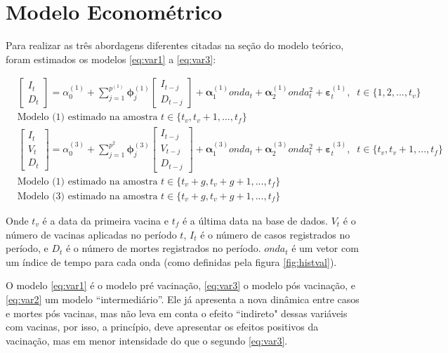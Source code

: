 \documentclass[
    article,
	12pt,				%
	oneside,			%
	a4paper,			%
	english,			%
	brazil,				%
	hyperref = {colorlinks, citecolor=c1d, linkcolor=c2d, urlcolor=c3d, colorlinks}
	]{abntex2}
\newcounter{j}
\begin{document}
\let\clearpage\relax
\chapter{Modelo Econométrico}\label{sec:model}

Para realizar as três abordagens diferentes citadas na seção do modelo teórico, foram estimados os modelos \eqref{eq:var1} a \eqref{eq:var3}:

\begin{align}
&\begin{bmatrix}
I_t \\ D_t
\end{bmatrix}
= \alpha_0^{(1)} + \sum_{j=1}^{p^{(1)}}\pmb{\phi}_j^{(1)}
\begin{bmatrix}
I_{t-j} \\ D_{t-j}
\end{bmatrix}
+ \pmb{\alpha}^{(1)}_1onda_t + \pmb{\alpha}^{(1)}_2onda_t^2 + \pmb{\varepsilon}_{t}^{(1)}, \;\; t \in \{1, 2, ..., t_v\} \label{eq:var1}\\
&\text{Modelo (1) estimado na amostra } t \in \{t_v, t_v+1, ..., t_f\}\label{eq:var2}\\
&\begin{bmatrix}
I_t \\ V_t \\ D_t
\end{bmatrix}
= \alpha_0^{(3)} + \sum_{j=1}^{p^2}\pmb{\phi}_j^{(3)}
\begin{bmatrix}
I_{t-j} \\ V_{t-j} \\ D_{t-j}
\end{bmatrix}
+ \pmb{\alpha}^{(3)}_1onda_t + \pmb{\alpha}^{(3)}_2onda_t^2 + \pmb{\varepsilon}_{t}^{(3)}, \;\; t \in \{t_v, t_v+1, ..., t_f\}\label{eq:var3}\\
&\text{Modelo (1) estimado na amostra } t \in \{t_v+g, t_v+g+1, ..., t_f\}\label{eq:var4}\\
&\text{Modelo (3) estimado na amostra } t \in \{t_v+g, t_v+g+1, ..., t_f\}\label{eq:var5}
\end{align}

\noindent Onde $t_v$ é a data da primeira vacina e $t_f$ é a última data na base de dados. $V_t$ é o número de vacinas aplicadas no período $t$, $I_t$ é o número de casos registrados no período, e  $D_t$ é o número de mortes registrados no período. $onda_t$ é um vetor com um índice de tempo para cada onda (como definidas pela figura \ref{fig:histval}).

O modelo \eqref{eq:var1} é o modelo pré vacinação, \eqref{eq:var3} o modelo pós vacinação, e \eqref{eq:var2} um modelo ``intermediário''. Ele já apresenta a nova dinâmica entre casos e mortes pós vacinas, mas não leva em conta o efeito ``indireto" dessas variáveis com vacinas, por isso, a princípio, deve apresentar os efeitos positivos da vacinação, mas em menor intensidade do que o segundo \eqref{eq:var3}.
\end{document}
